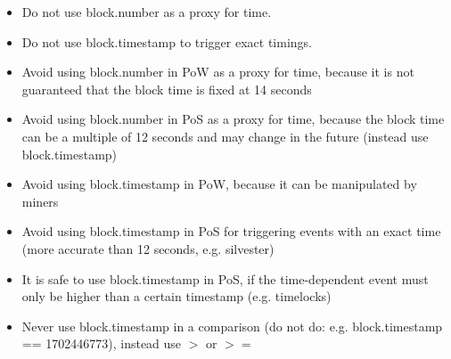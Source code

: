 \begin{itemize}
  \item Do not use block.number as a proxy for time.
  \item Do not use block.timestamp to trigger exact timings.
  \item Avoid using block.number in PoW as a proxy for time, because it is not guaranteed that the block time is fixed at 14 seconds \\
  \item Avoid using block.number in PoS as a proxy for time, because the block time can be a multiple of 12 seconds and may change in the future (instead use block.timestamp)\\
  \item Avoid using block.timestamp in PoW, because it can be manipulated by miners \\
  \item Avoid using block.timestamp in PoS for triggering events with an exact time (more accurate than 12 seconds, e.g. silvester) \\
  \item It is safe to use block.timestamp in PoS, if the time-dependent event must only be higher than a certain timestamp (e.g. timelocks) \\
  \item Never use block.timestamp in a comparison (do not do: e.g. block.timestamp == 1702446773), instead use $>$ or $>=$
\end{itemize}


